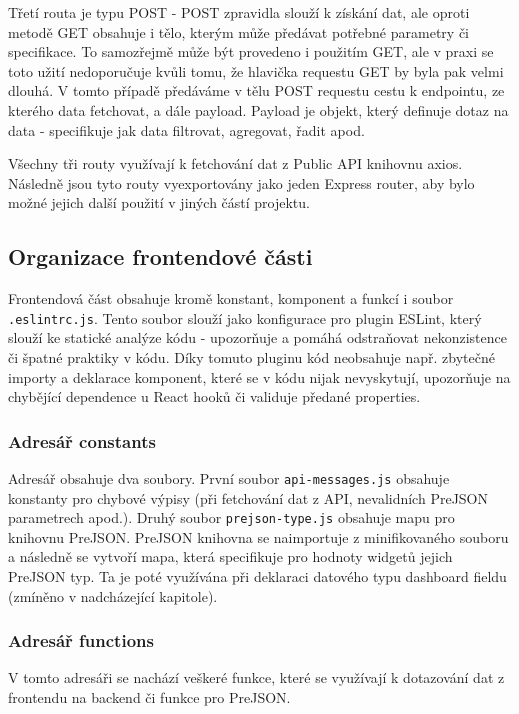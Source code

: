 \documentclass[czech, bc, kiv, he, iso690numb]{fasthesis}
\begin{document}
Třetí routa je typu POST - POST zpravidla slouží k získání dat, ale oproti metodě GET obsahuje i tělo, kterým může předávat potřebné parametry či specifikace. To samozřejmě může být provedeno i
použitím GET, ale v praxi se toto užití nedoporučuje kvůli tomu, že hlavička requestu GET by byla pak velmi dlouhá. V tomto případě předáváme v tělu POST requestu cestu k endpointu, ze kterého data
fetchovat, a dále payload. Payload je objekt, který definuje dotaz na data - specifikuje jak data filtrovat, agregovat, řadit apod. 

Všechny tři routy využívají k fetchování dat z Public API knihovnu axios. Následně jsou tyto routy vyexportovány jako jeden Express router, aby bylo možné jejich další použití v jiných částí projektu.

\subsection{Organizace frontendové části}

Frontendová část obsahuje kromě konstant, komponent a funkcí i soubor \texttt{.eslintrc.js}. Tento soubor slouží jako konfigurace pro plugin ESLint, který slouží ke statické analýze
kódu - upozorňuje a pomáhá odstraňovat nekonzistence či špatné praktiky v kódu. Díky tomuto pluginu kód neobsahuje např. zbytečné importy a deklarace komponent, které se v kódu nijak nevyskytují,
upozorňuje na chybějící dependence u React hooků či validuje předané properties.

\subsubsection{Adresář constants}

Adresář obsahuje dva soubory. První soubor \texttt{api-messages.js} obsahuje konstanty pro chybové výpisy (při fetchování dat z API, nevalidních PreJSON parametrech apod.).
Druhý soubor \texttt{prejson-type.js} obsahuje mapu pro knihovnu PreJSON. PreJSON knihovna se naimportuje z minifikovaného souboru a následně se vytvoří mapa, která specifikuje
pro hodnoty widgetů jejich PreJSON typ. Ta je poté využívána při deklaraci datového typu dashboard fieldu (zmíněno v nadcházející kapitole).

\subsubsection{Adresář functions}

V tomto adresáři se nachází veškeré funkce, které se využívají k dotazování dat z frontendu na backend či funkce pro PreJSON.
\end{document}
